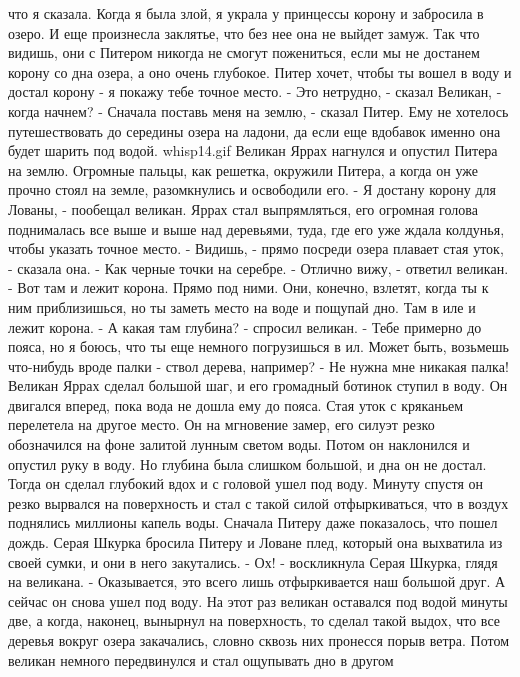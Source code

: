 что я сказала. Когда я была злой, я украла у принцессы корону и 
забросила в озеро. И еще произнесла заклятье, что без нее она не 
выйдет замуж. Так что видишь, они с Питером никогда не смогут 
пожениться, если мы не достанем корону со дна озера, а оно очень 
глубокое. Питер хочет, чтобы ты вошел в воду и достал корону - я 
покажу тебе точное место.
    - Это нетрудно, - сказал Великан, - когда начнем?
    - Сначала поставь меня на землю, - сказал Питер. Ему не хотелось 
путешествовать до середины озера на ладони, да если еще вдобавок 
именно она будет шарить под водой.
    {whisp14.gif}
    Великан Яррах нагнулся и опустил Питера на землю. Огромные пальцы, 
как решетка, окружили Питера, а когда он уже прочно стоял на земле, 
разомкнулись и освободили его.
    - Я достану корону для Лованы, - пообещал великан.
    Яррах стал выпрямляться, его огромная голова поднималась все выше 
и выше над деревьями, туда, где его уже ждала колдунья, чтобы указать 
точное место.
    - Видишь, - прямо посреди озера плавает стая уток, - сказала она. 
- Как черные точки на серебре.
    - Отлично вижу, - ответил великан.
    - Вот там и лежит корона. Прямо под ними. Они, конечно, взлетят, 
когда ты к ним приблизишься, но ты заметь место на воде и пощупай дно. 
Там в иле и лежит корона.
    - А какая там глубина? - спросил великан.
    - Тебе примерно до пояса, но я боюсь, что ты еще немного 
погрузишься в ил. Может быть, возьмешь что-нибудь вроде палки - ствол 
дерева, например?
    - Не нужна мне никакая палка!
    Великан Яррах сделал большой шаг, и его громадный ботинок ступил в 
воду. Он двигался вперед, пока вода не дошла ему до пояса. Стая уток с 
кряканьем перелетела на другое место.
    Он на мгновение замер, его силуэт резко обозначился на фоне 
залитой лунным светом воды. Потом он наклонился и опустил руку в воду. 
Но глубина была слишком большой, и дна он не достал. Тогда он сделал 
глубокий вдох и с головой ушел под воду. Минуту спустя он резко 
вырвался на поверхность и стал с такой силой отфыркиваться, что в 
воздух поднялись миллионы капель воды.
    Сначала Питеру даже показалось, что пошел дождь. Серая Шкурка 
бросила Питеру и Ловане плед, который она выхватила из своей сумки, и 
они в него закутались.
    - Ох! - воскликнула Серая Шкурка, глядя на великана. - 
Оказывается, это всего лишь отфыркивается наш большой друг. А сейчас 
он снова ушел под воду.
    На этот раз великан оставался под водой минуты две, а когда, 
наконец, вынырнул на поверхность, то сделал такой выдох, что все 
деревья вокруг озера закачались, словно сквозь них пронесся порыв 
ветра.
    Потом великан немного передвинулся и стал ощупывать дно в другом 
